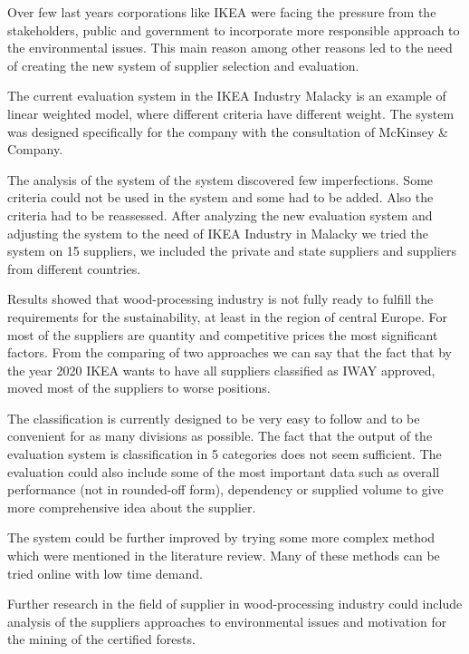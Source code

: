 \documentclass[oneside,12pt]{article}%
\begin{document}
Over few last years corporations like IKEA were facing the pressure from the stakeholders, public and government to incorporate more responsible approach to the environmental issues. This main reason among other reasons led to the need of creating the new system of supplier selection and evaluation. \par
The current evaluation system in the IKEA Industry Malacky is an example of linear weighted model, where different criteria have different weight. The system was designed specifically for the company with the consultation of McKinsey & Company. \par
The analysis of the system of the system discovered few imperfections. Some criteria could not be used in the system and some had to be added. Also the criteria had to be reassessed. After analyzing the new evaluation system and adjusting the system to the need of IKEA Industry in Malacky we tried the system on 15 suppliers, we included the private and state suppliers and suppliers from different countries.  \par
Results showed that wood-processing industry is not fully ready to fulfill the requirements for the sustainability, at least in the region of central Europe. For most of the suppliers are quantity and competitive prices the most significant factors. From the comparing of  two approaches we can say that the fact that by the year 2020 IKEA wants to have all suppliers classified as IWAY approved, moved most of the suppliers to worse positions.  \par
The classification is currently designed to be very easy to follow and to be convenient for as many divisions as possible. The fact that the output of the evaluation system is classification in 5 categories does not seem sufficient. The evaluation could also include some of the most important data such as overall performance (not in rounded-off form), dependency or supplied volume to give more comprehensive idea about the supplier. \par
The system could be further improved by trying some more complex method which were mentioned in the literature review. Many of these methods can be tried online with low time demand. \par
Further research in the field of supplier in wood-processing industry could include analysis of the suppliers approaches to environmental issues and motivation for the mining of the certified forests.



\end{document}
